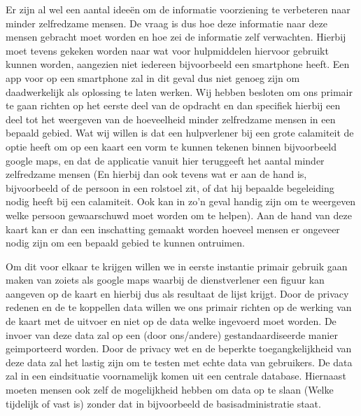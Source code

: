 Er zijn al wel een aantal idee\"{e}n om de informatie voorziening te verbeteren naar minder zelfredzame mensen. De vraag is dus hoe deze informatie naar deze mensen gebracht moet worden en hoe zei de informatie zelf verwachten. Hierbij moet tevens gekeken worden naar wat voor hulpmiddelen hiervoor gebruikt kunnen worden, aangezien niet iedereen bijvoorbeeld een smartphone heeft. Een app voor op een smartphone zal in dit geval dus niet genoeg zijn om daadwerkelijk als oplossing te laten werken.
Wij hebben besloten om ons primair te gaan richten op het eerste deel van de opdracht en dan specifiek hierbij een deel tot het weergeven van de hoeveelheid minder zelfredzame mensen in een bepaald gebied.
Wat wij willen is dat een hulpverlener bij een grote calamiteit de optie heeft om op een kaart een vorm te kunnen tekenen binnen bijvoorbeeld google maps, en dat de applicatie vanuit hier teruggeeft het aantal minder zelfredzame mensen (En hierbij dan ook tevens wat er aan de hand is, bijvoorbeeld of de persoon in een rolstoel zit, of dat hij bepaalde begeleiding nodig heeft bij een calamiteit. Ook kan in zo'n geval handig zijn om te weergeven welke persoon gewaarschuwd moet worden om te helpen). Aan de hand van deze kaart kan er dan een inschatting gemaakt worden hoeveel mensen er ongeveer nodig zijn om een bepaald gebied te kunnen ontruimen. 

Om dit voor elkaar te krijgen willen we in eerste instantie primair gebruik gaan maken van zoiets als google maps waarbij de dienstverlener een figuur kan aangeven op de kaart en hierbij dus als resultaat de lijst krijgt. Door de privacy redenen en de te koppellen data willen we ons primair richten op de werking van de kaart met de uitvoer en niet op de data welke ingevoerd moet worden. De invoer van deze data zal op een (door ons/andere) gestandaardiseerde manier geimporteerd worden. Door de privacy wet en de beperkte toegangkelijkheid van deze data zal het lastig zijn om te testen met echte data van gebruikers. De data zal in een eindsituatie voornamelijk komen uit een centrale database. Hiernaast moeten mensen ook zelf de mogelijkheid hebben om data op te slaan (Welke tijdelijk of vast is) zonder dat in bijvoorbeeld de basisadministratie staat. 

